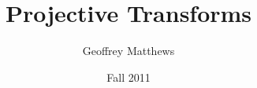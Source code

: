 \documentclass[slidestop,xcolor=pst]{beamer}
\title[Projective Transforms]
{
Projective Transforms
}
\subtitle{} %
\author[Geoffrey Matthews]
{Geoffrey Matthews}
\institute[WWU/CS]
{
  Department of Computer Science\\
  Western Washington University
}
\date{Fall 2011}
\begin{document}
\begin{frame}
  \titlepage
\end{frame}

\newcommand{\myref}[1]{\small\item\url{#1}}
\newcommand{\myreff}[1]{\scriptsize\item\url{#1}}


\newcommand{\myframe}[4]{
\pstThreeDLine[arrows=->](#1)(#2)
\pstThreeDLine[arrows=->](#1)(#3)
\pstThreeDLine[arrows=->](#1)(#4)
}

\newcommand{\vtwo}[2]{
\left[\begin{array}{c} #1 \\ #2\end{array}\right]
}
\newcommand{\mtwo}[4]{
\left[\begin{array}{cc} #1 & #2 \\ #3 & #4\end{array}\right]
}
\newcommand{\vthree}[3]{
\left[\begin{array}{c} #1 \\ #2 \\ #3\end{array}\right]
}
\newcommand{\mthree}[9]{
\left[\begin{array}{ccc} #1&#2&#3\\#4&#5&#6\\#7&#8&#9\end{array}\right]
}
\newcommand{\vhomo}[1]{
\left[\begin{array}{c} #1 \\ 0\end{array}\right]
}
\newcommand{\phomo}[1]{
\left[\begin{array}{c} #1 \\ 1\end{array}\right]
}
\newcommand{\whomo}[1]{
\left[\begin{array}{c} #1 \end{array}\right]
}

\newcommand{\mhomo}[3]{
\left[\begin{array}{cccc} #1 \\ #2 \\ #3 \\0&0&0&1\end{array}\right]
}
\newcommand{\wmhomo}[4]{
\left[\begin{array}{cccc} #1 \\ #2 \\ #3 \\ #4\end{array}\right]
}
\end{document}
